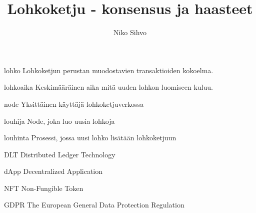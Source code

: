 \documentclass[utf8,bachelor]{gradu3}
\providecommand{\DIFaddbegin}{} %
\providecommand{\DIFaddend}{} %
\providecommand{\DIFdelbegin}{} %
\providecommand{\DIFdelend}{} %
\newcommand{\DIFscaledelfig}{0.5}
\newlength{\DIFdelgraphicswidth} %
\newlength{\DIFdelgraphicsheight} %
\newcommand{\DIFaddincludegraphics}[2][]{{\color{blue}\fbox{\DIFOincludegraphics[#1]{#2}}}} %
\newcommand{\DIFdelincludegraphics}[2][]{%
\sbox{\DIFdelgraphicsbox}{\DIFOincludegraphics[#1]{#2}}%
\settoboxwidth{\DIFdelgraphicswidth}{\DIFdelgraphicsbox} %
\settoboxtotalheight{\DIFdelgraphicsheight}{\DIFdelgraphicsbox} %
\scalebox{\DIFscaledelfig}{%
\parbox[b]{\DIFdelgraphicswidth}{\usebox{\DIFdelgraphicsbox}\\[-\baselineskip] \rule{\DIFdelgraphicswidth}{0em}}\llap{\resizebox{\DIFdelgraphicswidth}{\DIFdelgraphicsheight}{%
\setlength{\unitlength}{\DIFdelgraphicswidth}%
\begin{picture}(1,1)%
\thicklines\linethickness{2pt} %
{\color[rgb]{1,0,0}\put(0,0){\framebox(1,1){}}}%
{\color[rgb]{1,0,0}\put(0,0){\line( 1,1){1}}}%
{\color[rgb]{1,0,0}\put(0,1){\line(1,-1){1}}}%
\end{picture}%
}\hspace*{3pt}}} %
} %
\DeclareRobustCommand{\DIFaddbegin}{\DIFOaddbegin \let\includegraphics\DIFaddincludegraphics} %
\DeclareRobustCommand{\DIFaddend}{\DIFOaddend \let\includegraphics\DIFOincludegraphics} %
\DeclareRobustCommand{\DIFdelbegin}{\DIFOdelbegin \let\includegraphics\DIFdelincludegraphics} %
\DeclareRobustCommand{\DIFdelend}{\DIFOaddend \let\includegraphics\DIFOincludegraphics} %
\begin{document}
\title{Lohkoketju - konsensus ja haasteet}
\DIFdelbegin %
\DIFdelend \DIFaddbegin {}
\DIFaddend \tiivistelma{%

}
\abstract{%

}

\author{Niko Sihvo}
\DIFdelbegin %
\DIFdelend \DIFaddbegin {}
\DIFaddend %


\maketitle


\begin{thetermlist}
\item[lohko] Lohkoketjun perustan muodostavien transaktioiden kokoelma.
\item[lohkoaika] Keskimääräinen aika mitä uuden lohkon luomiseen kuluu.
\item[node] Yksittäinen käyttäjä lohkoketjuverkossa
\item[louhija] Node, joka luo uusia lohkoja
\item[louhinta] Prosessi, jossa uusi lohko lisätään lohkoketjuun 
\item[DLT] Distributed Ledger Technology
\item[dApp] Decentralized Application
\item[NFT] Non-Fungible Token
\item[GDPR] The European General Data Protection Regulation
\end{thetermlist}
\end{document}
